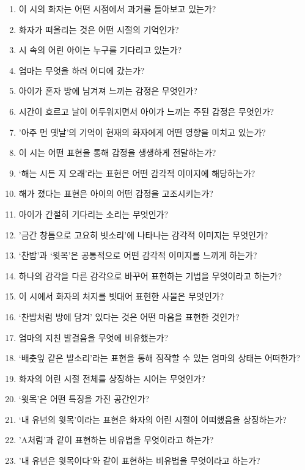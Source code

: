 \documentclass[fs9,seriesRus]{korfarm-base}
\begin{document}
\kfActivityBg {}
\par{}\par\nopagebreak[4]\smallskip\nopagebreak[4]
\kfBeginMC
\begin{enumerate}[leftmargin=22pt, itemsep=6pt, topsep=4pt, label=\textbf{\arabic*.}]
\item 이 시의 화자는 어떤 시점에서 과거를 돌아보고 있는가?
\item 화자가 떠올리는 것은 어떤 시절의 기억인가?
\item 시 속의 어린 아이는 누구를 기다리고 있는가?
\item 엄마는 무엇을 하러 어디에 갔는가?
\item 아이가 혼자 방에 남겨져 느끼는 감정은 무엇인가?
\item 시간이 흐르고 날이 어두워지면서 아이가 느끼는 주된 감정은 무엇인가?
\item '아주 먼 옛날'의 기억이 현재의 화자에게 어떤 영향을 미치고 있는가?
\item 이 시는 어떤 표현을 통해 감정을 생생하게 전달하는가?
\item ‘해는 시든 지 오래’라는 표현은 어떤 감각적 이미지에 해당하는가?
\item 해가 졌다는 표현은 아이의 어떤 감정을 고조시키는가?
\item 아이가 간절히 기다리는 소리는 무엇인가?
\item '금간 창틈으로 고요히 빗소리'에 나타나는 감각적 이미지는 무엇인가?
\item ‘찬밥’과 ‘윗목’은 공통적으로 어떤 감각적 이미지를 느끼게 하는가?
\item 하나의 감각을 다른 감각으로 바꾸어 표현하는 기법을 무엇이라고 하는가?
\item 이 시에서 화자의 처지를 빗대어 표현한 사물은 무엇인가?
\item ‘찬밥처럼 방에 담겨’ 있다는 것은 어떤 마음을 표현한 것인가?
\item 엄마의 지친 발걸음을 무엇에 비유했는가?
\item ‘배춧잎 같은 발소리’라는 표현을 통해 짐작할 수 있는 엄마의 상태는 어떠한가?
\item 화자의 어린 시절 전체를 상징하는 시어는 무엇인가?
\item ‘윗목’은 어떤 특징을 가진 공간인가?
\item ‘내 유년의 윗목’이라는 표현은 화자의 어린 시절이 어떠했음을 상징하는가?
\item 'A처럼'과 같이 표현하는 비유법을 무엇이라고 하는가?
\item '내 유년은 윗목이다'와 같이 표현하는 비유법을 무엇이라고 하는가?
\end{enumerate}
\kfEndMC
\end{document}
